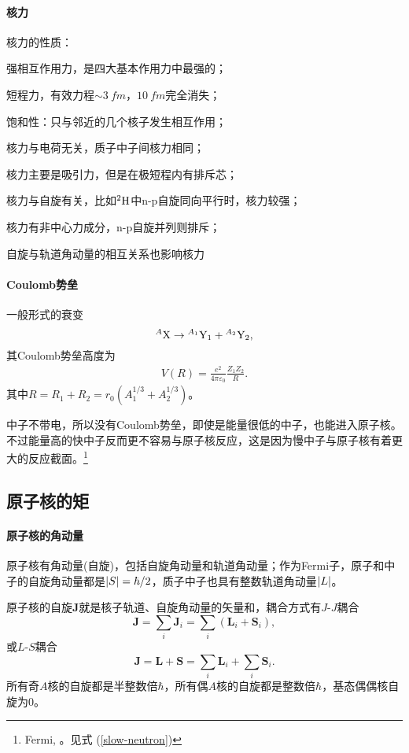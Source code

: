 \paragraph{核力}核力的性质：
\begin{compactenum}
	\item 强相互作用力，是四大基本作用力中最强的；
	\item 短程力，有效力程$\sim\SI{3}{fm}$，$\SI{10}{fm}$完全消失；
	\item 饱和性：只与邻近的几个核子发生相互作用；
	\item 核力与电荷无关，质子中子间核力相同；
	\item 核力主要是吸引力，但是在极短程内有排斥芯；
	\item 核力与自旋有关，比如${^{2}\mathrm{H}}$中n-p自旋同向平行时，核力较强；
	\item 核力有非中心力成分，n-p自旋并列则排斥；
	\item 自旋与轨道角动量的相互关系也影响核力
\end{compactenum}
\paragraph{Coulomb势垒}
一般形式的衰变
\[
	{^{A}\mathrm{X}}\to{^{A_1}\mathrm{Y_1}}+{^{A_2}\mathrm{Y_2}},
\]
其Coulomb势垒高度为
\begin{align}
	V(R)=\frac{e^2}{4\pi\varepsilon_0}\frac{Z_1Z_2}{R}.
\end{align}
其中$R=R_1+R_2=r_0(A_1^{1/3}+A_2^{1/3})$。

中子不带电，所以没有Coulomb势垒，即使是能量很低的中子，也能进入原子核。不过能量高的快中子反而更不容易与原子核反应，这是因为慢中子与原子核有着更大的反应截面。\footnote{Fermi, 。见式 (\ref{slow-neutron})}

\subsection{原子核的矩}
\paragraph{原子核的角动量}原子核有角动量(自旋)，包括自旋角动量和轨道角动量；作为Fermi子，原子和中子的自旋角动量都是$\left\lvert S\right\rvert=\hbar/2$，质子中子也具有整数轨道角动量$\left\lvert L\right\rvert$。

原子核的自旋$\bm J$就是核子轨道、自旋角动量的矢量和，耦合方式有$J$-$J$耦合
\[
	\bm J=\sum_i\bm J_i=\sum_i(\bm L_i+\bm S_i),
\]
或$L$-$S$耦合
\[
	\bm J=\bm L+\bm S=\sum_i\bm L_i+\sum_i\bm S_i.
\]
所有奇$A$核的自旋都是半整数倍$\hbar$，所有偶$A$核的自旋都是整数倍$\hbar$，基态偶偶核自旋为0。

